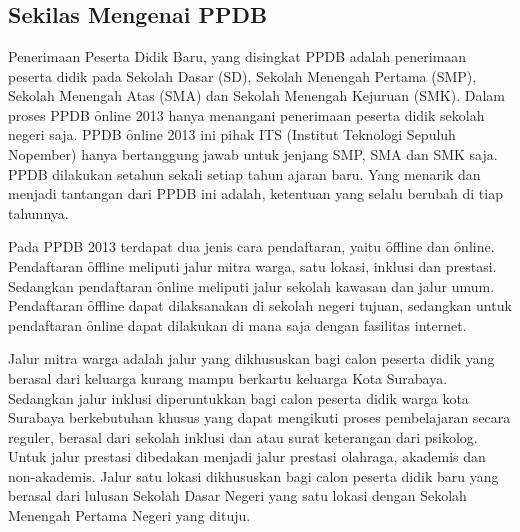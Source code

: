 \chapter{\babSatu}
\section{Sekilas Mengenai PPDB}

Penerimaan Peserta Didik Baru, yang disingkat PPDB adalah penerimaan peserta
didik pada Sekolah Dasar (SD), Sekolah Menengah Pertama (SMP), Sekolah Menengah
Atas (SMA) dan Sekolah Menengah Kejuruan (SMK). Dalam proses PPDB \f{online}
2013 hanya menangani penerimaan peserta didik sekolah negeri saja. PPDB
\f{online} 2013 ini pihak ITS (Institut Teknologi Sepuluh Nopember) hanya
bertanggung jawab untuk jenjang SMP, SMA dan SMK saja. PPDB dilakukan setahun
sekali setiap tahun ajaran baru. Yang menarik dan menjadi tantangan dari PPDB
ini adalah, ketentuan yang selalu berubah di tiap tahunnya. 

Pada PPDB 2013 terdapat dua jenis cara pendaftaran, yaitu \f{offline} dan
\f{online}.  Pendaftaran \f{offline} meliputi jalur mitra warga, satu lokasi,
inklusi dan prestasi.  Sedangkan pendaftaran \f{online} meliputi jalur
sekolah kawasan dan jalur umum. Pendaftaran \f{offline} dapat dilaksanakan
di sekolah negeri tujuan, sedangkan untuk pendaftaran \f{online} dapat
dilakukan di mana saja dengan fasilitas internet.

Jalur mitra warga adalah jalur yang dikhususkan bagi calon peserta didik yang
berasal dari keluarga kurang mampu berkartu keluarga Kota Surabaya. Sedangkan
jalur inklusi diperuntukkan bagi calon peserta didik warga kota Surabaya
berkebutuhan khusus yang dapat mengikuti proses pembelajaran secara reguler,
berasal dari sekolah inklusi dan atau surat keterangan dari psikolog. Untuk
jalur prestasi dibedakan menjadi jalur prestasi olahraga, akademis dan
non-akademis. Jalur satu lokasi dikhususkan bagi calon peserta didik baru yang
berasal dari lulusan Sekolah Dasar Negeri yang satu lokasi dengan Sekolah
Menengah Pertama Negeri yang dituju.  

